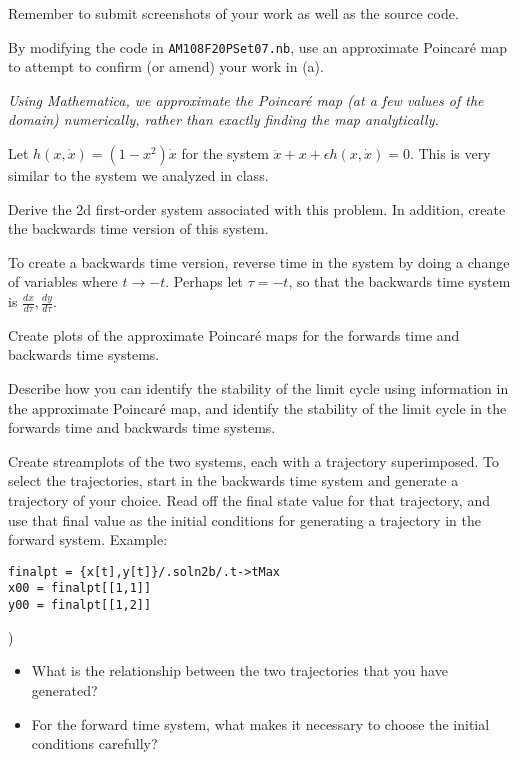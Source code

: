 \documentclass[12pt,letterpaper,noanswers]{exam}
\begin{document}
\begin{questions}
\begin{parts}
Remember to submit screenshots of your work as well as the source code.
\item By modifying the code in \texttt{AM108F20PSet07.nb}, use an approximate Poincar\'e map to attempt to confirm (or amend) your work in (a).

\emph{Using Mathematica, we approximate the Poincar\'e map (at a few values of the domain) numerically, rather than exactly finding the map analytically.}
\end{parts}

\item Let $h(x,\dot x) = (1-x^2)\dot x$ for the system $\ddot x + x + \epsilon h(x,\dot x) = 0$.  This is very similar to the system we analyzed in class.
\begin{parts}
\item Derive the 2d first-order system associated with this problem.  In addition, create the backwards time version of this system.

To create a backwards time version, reverse time in the system by doing a change of variables where $t\rightarrow -t$.  Perhaps let $\tau = -t$, so that the backwards time system is $\frac{dx}{d\tau}, \frac{dy}{d\tau}$.
\item Create plots of the approximate Poincar\'e maps for the forwards time and backwards time systems. 
\item Describe how you can identify the stability of the limit cycle using information in the approximate Poincar\'e map, and identify the stability of the limit cycle in the forwards time and backwards time systems.
\item Create streamplots of the two systems, each with a trajectory superimposed.  To select the trajectories, start in the backwards time system and generate a trajectory of your choice.  Read off the final state value for that trajectory, and use that final value as the initial conditions for generating a trajectory in the forward system.
Example: \begin{verbatim}
finalpt = {x[t],y[t]}/.soln2b/.t->tMax
x00 = finalpt[[1,1]]
y00 = finalpt[[1,2]]
\end{verbatim}
)

\begin{itemize}
\item What is the relationship between the two trajectories that you have generated?
\item For the forward time system, what makes it necessary to choose the initial conditions carefully?
\end{itemize}


\end{parts}


\end{questions}
\end{document}
